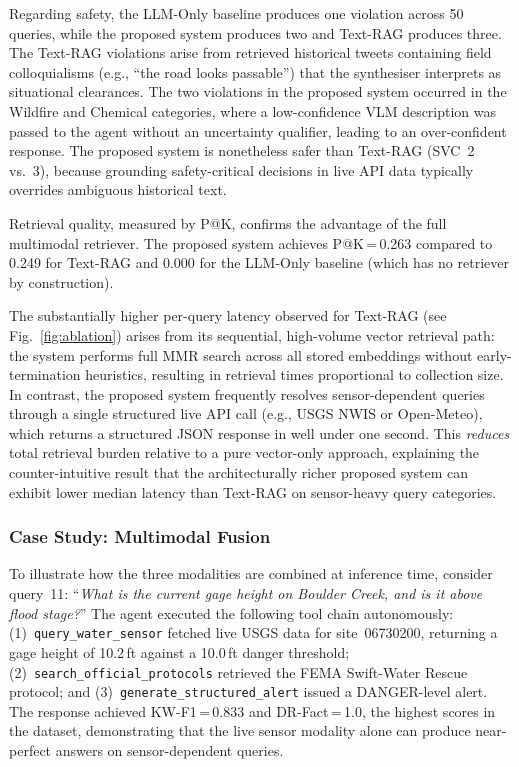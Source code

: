 \documentclass[conference]{IEEEtran}
\begin{document}
Regarding safety, the LLM-Only baseline produces one violation across
50 queries, while the proposed system produces two and Text-RAG
produces three. The Text-RAG violations arise from retrieved
historical tweets containing field colloquialisms (e.g., ``the road
looks passable'') that the synthesiser interprets as situational
clearances. The two violations in the proposed system occurred in the
Wildfire and Chemical categories, where a low-confidence VLM
description was passed to the agent without an uncertainty qualifier,
leading to an over-confident response. The proposed system is
nonetheless safer than Text-RAG (SVC~2 vs.~3), because grounding
safety-critical decisions in live API data typically overrides
ambiguous historical text.

Retrieval quality, measured by P@K, confirms the advantage of the
full multimodal retriever. The proposed system achieves P@K\,=\,0.263
compared to 0.249 for Text-RAG and 0.000 for the LLM-Only baseline
(which has no retriever by construction).

The substantially higher per-query latency observed for Text-RAG
(see Fig.~\ref{fig:ablation}) arises from its sequential, high-volume
vector retrieval path: the system performs full MMR search across all
stored embeddings without early-termination heuristics, resulting in
retrieval times proportional to collection size. In contrast, the
proposed system frequently resolves sensor-dependent queries through
a single structured live API call (e.g., USGS NWIS or Open-Meteo),
which returns a structured JSON response in well under one second.
This \emph{reduces} total retrieval burden relative to a pure
vector-only approach, explaining the counter-intuitive result that
the architecturally richer proposed system can exhibit lower median
latency than Text-RAG on sensor-heavy query categories.

\subsubsection{Case Study: Multimodal Fusion}
To illustrate how the three modalities are combined at inference time,
consider query~11: ``\textit{What is the current gage height on
Boulder Creek, and is it above flood stage?}'' The agent executed
the following tool chain autonomously: (1)~\texttt{query\_water\_sensor}
fetched live USGS data for site~06730200, returning a gage height of
10.2\,ft against a 10.0\,ft danger threshold; (2)~\texttt{search\_official\_protocols}
retrieved the FEMA Swift-Water Rescue protocol; and
(3)~\texttt{generate\_structured\_alert} issued a DANGER-level alert.
The response achieved KW-F1\,=\,0.833 and DR-Fact\,=\,1.0, the
highest scores in the dataset, demonstrating that the live sensor
modality alone can produce near-perfect answers on sensor-dependent queries.
\end{document}
